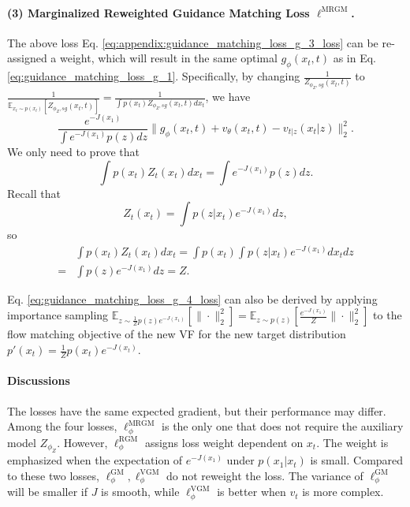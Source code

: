 \paragraph{(3) Marginalized Reweighted Guidance Matching Loss $\ell^{\text{MRGM}}$.} The above loss Eq. \eqref{eq:appendix:guidance_matching_loss_g_3_loss} can be re-assigned a weight, which will result in the same optimal $g_{\phi}(x_t,t)$ as in Eq. \eqref{eq:guidance_matching_loss_g_1}. Specifically, by changing $\frac{1}{Z_{\phi_Z,sg}(x_t,t)}$ to $\frac{1}{\mathbb{E}_{x_t\sim p(x_t)}[Z_{\phi_Z,sg}(x_t,t)]}=\frac{1}{\int p(x_t)Z_{\phi_Z,sg}(x_t,t) dx_t}$, we have 
\begin{equation}\label{eq:appendix:guidance_matching_loss_g_4_loss_appendix}
    \frac{e^{-J(x_1)}}{\int e^{-J(x_1)} p(z)dz} \|g_{\phi}(x_t,t) + v_\theta(x_t,t) - v_{t|z}(x_t|z)\|_2^2.
\end{equation}
We only need to prove that
\begin{equation}
    \int p(x_t)Z_{t}(x_t) dx_t = \int e^{-J(x_1)} p(z)dz.
\end{equation}
Recall  that 
\begin{equation}
    Z_{t}(x_t) = \int p(z|x_t) e^{-J(x_1)} dz,
\end{equation}
so 
\begin{align}
    &\int p(x_t)Z_{t}(x_t) dx_t
    = \int  p(x_t)\int p(z|x_t) e^{-J(x_1)} dx_t dz \\
    =& \int p(z)e^{-J(x_1)}dz = Z.
\end{align}

Eq. \eqref{eq:guidance_matching_loss_g_4_loss} can also be derived by applying importance sampling $\mathbb{E}_{z\sim \frac{1}{Z}p(z)e^{-J(x_1)}}\left[\|\cdot\|_2^2 \right]=\mathbb{E}_{z\sim p(z)}\left[ \frac{e^{-J(x_1)}}{Z} \|\cdot\|_2^2  \right]$ to the flow matching objective of the new VF for the new target distribution $p'(x_t) = \frac{1}{Z} p(x_t) e^{-J(x_t)}$.


\paragraph{Discussions}
The losses have the same expected gradient, but their performance may differ. Among the four losses, $\ell_\phi^{\text{MRGM}}$ is the only one that does not require the auxiliary model $Z_{\phi_Z}$. However, $\ell_\phi^{\text{RGM}}$ assigns loss weight dependent on $x_t$. The weight is emphasized when the expectation of $e^{-J(x_1)}$ under $p(x_1|x_t)$ is small. Compared to these two losses, $\ell_\phi^{\text{GM}},\ell_\phi^{\text{VGM}}$ do not reweight the loss. The variance of $\ell_\phi^{\text{GM}}$ will be smaller if $J$ is smooth, while $\ell_\phi^{\text{VGM}}$ is better when $v_t$ is more complex.

